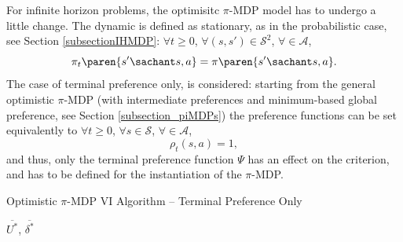For infinite horizon problems, the optimisitc $\pi$-MDP model 
has to undergo a little change.
The dynamic is defined as stationary,
as in the probabilistic case, see Section \ref{subsectionIHMDP}:
$\forall t \geqslant 0$,
$\forall (s,s') \in \mathcal{S}^2$, $\forall \in \mathcal{A}$,
\[ \pi_t \paren{ s' \sachant s,a  } = \pi \paren{ s' \sachant s,a  }. \]
The case of terminal preference only, is considered: 
starting from the general optimistic $\pi$-MDP 
(with intermediate preferences and minimum-based global preference,
see Section \ref{subsection_piMDPs}) 
the preference functions can be set equivalently to 
$\forall t \geqslant 0$, $\forall s \in \mathcal{S}$, $\forall \in \mathcal{A}$,
\[ \rho_t(s,a) = 1,\]
and thus, only the terminal preference function $\Psi$
has an effect on the criterion,
and has to be defined 
for the instantiation of the $\pi$-MDP.

\begin{algorithm} \caption{ Optimistic $\pi$-MDP VI Algorithm -- Terminal Preference Only} 
\label{algorithmIVPIMDP}
\Return $\overline{U^*}$, $\overline{\delta^*}$ \;
\end{algorithm}

